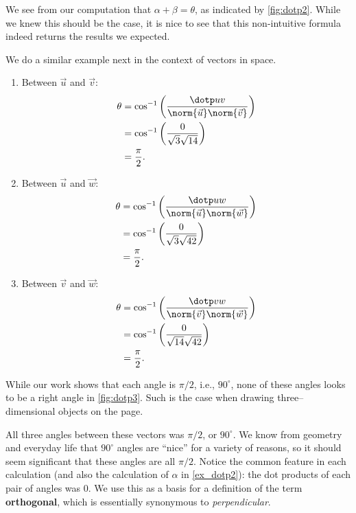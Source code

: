 We see from our computation that $\alpha + \beta = \theta$, as indicated by \autoref{fig:dotp2}. While we knew this should be the case, it is nice to see that this non-intuitive formula indeed returns the results we expected.

We do a similar example next in the context of vectors in space.


{\begin{enumerate}
	\item Between $\vec u$ and $\vec v$:
	\begin{align*}
		\theta &= \cos^{-1}\left(\frac{\dotp uv}{\norm{\vec u}\norm{\vec v}}\right)\\
		&= \cos^{-1}\left(\frac{0}{\sqrt{3}\sqrt{14}}\right)\\
		&= \frac{\pi}2.
	\end{align*}
	\item	Between $\vec u$ and $\vec w$:
	\begin{align*}
		\theta &= \cos^{-1}\left(\frac{\dotp uw}{\norm{\vec u}\norm{\vec w}}\right)\\
		&= \cos^{-1}\left(\frac{0}{\sqrt{3}\sqrt{42}}\right)\\
		&= \frac{\pi}2.
	\end{align*}
	\item	Between $\vec v$ and $\vec w$:
	\begin{align*}
		\theta &= \cos^{-1}\left(\frac{\dotp vw}{\norm{\vec v}\norm{\vec w}}\right)\\
		&= \cos^{-1}\left(\frac{0}{\sqrt{14}\sqrt{42}}\right)\\
		&= \frac{\pi}2.
	\end{align*}
\end{enumerate}
While our work shows that each angle is $\pi/2$, i.e.,  $90^\circ$, none of these angles looks to be a right angle in \autoref{fig:dotp3}. Such is the case when drawing three--dimensional objects on the page.}

All three angles between these vectors was $\pi/2$, or $90^\circ$. We know from geometry and everyday life that $90^\circ$ angles are ``nice'' for a variety of reasons, so it should seem significant that these angles are all $\pi/2$. Notice the common feature in each calculation (and also the calculation of $\alpha$ in \autoref{ex_dotp2}): the dot products of each pair of angles was 0. We use this as a basis for a definition of the term \textbf{orthogonal}, which is essentially synonymous to \textit{perpendicular}.

